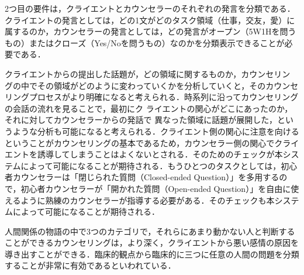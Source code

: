 \documentclass[shuuron]{kuee}
\begin{document}
2つ目の要件は，クライエントとカウンセラーのそれぞれの発言を分類である．クライエントの発言としては，どの1文がどのタスク領域（仕事，交友，愛）に属するのか，カウンセラーの発言としては，どの発言がオープン（5W1Hを問うもの）またはクローズ（Yes/Noを問うもの）なのかを分類表示できることが必要である．

クライエントからの提出した話題が，どの領域に関するものか，カウンセリン
グの中でその領域がどのように変わっていくかを分析していくと，そのカウンセ
リングプロセスがより明確になると考えられる．時系列に沿ってカウンセリングの会話の流れを見ることで，最初にク
ライエントの関心がどこにあったのか，それに対してカウンセラーからの発話で
異なった領域に話題が展開した，というような分析も可能になると考えられる．クライエント側の関心に注意を向けるということがカウンセリングの基本であるため，カウンセラー側の関心でクライエントを誘導してしまうことはよくないとされる．そのためのチェックが本システムによって可能になることが期待される．もうひとつのタスクとしては，初心者カウンセラーは「閉じられた質問（Closed-ended Question）」を多用するので，初心者カウンセラーが「開かれた質問（Open-ended Question）」を自由に使えるように熟練のカウンセラーが指導する必要がある．そのチェックも本システムによって可能になることが期待される．



%


人間関係の物語の中で3つのカテゴリで，それらにあまり動かない人と判断することができるカウンセリングは，より深く，クライエントから悪い感情の原因を導き出すことができる．臨床的観点から臨床的に三つに任意の人間の問題を分類することが非常に有効であるといわれている．
\end{document}
